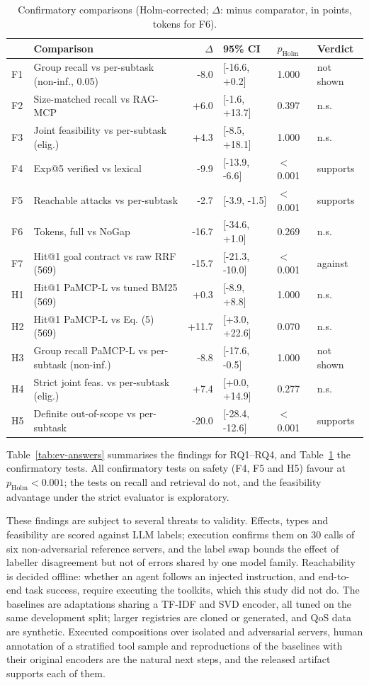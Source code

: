 \begin{table}[t]
\centering
\caption{Confirmatory comparisons (Holm-corrected; $\Delta$: \pamcp{} minus comparator, in points, tokens for F6).}
\label{tab:ev-family}
\scriptsize
\setlength{\tabcolsep}{2.2pt}
\begin{tabular}{@{}llrlll@{}}
\toprule
 & Comparison & $\Delta$ & 95\% CI & $p_{\mathrm{Holm}}$ & Verdict \\
\midrule
F1 & Group recall vs per-subtask (non-inf., 0.05) & -8.0 & [-16.6, +0.2] & 1.000 & not shown \\
F2 & Size-matched recall vs RAG-MCP & +6.0 & [-1.6, +13.7] & 0.397 & n.s. \\
F3 & Joint feasibility vs per-subtask (elig.) & +4.3 & [-8.5, +18.1] & 1.000 & n.s. \\
F4 & Exp@5 verified vs lexical & -9.9 & [-13.9, -6.6] & $<$0.001 & supports \\
F5 & Reachable attacks vs per-subtask & -2.7 & [-3.9, -1.5] & $<$0.001 & supports \\
F6 & Tokens, full vs NoGap & -16.7 & [-34.6, +1.0] & 0.269 & n.s. \\
F7 & Hit@1 goal contract vs raw RRF (569) & -15.7 & [-21.3, -10.0] & $<$0.001 & against \\
\midrule
H1 & Hit@1 PaMCP-L vs tuned BM25 (569) & +0.3 & [-8.9, +8.8] & 1.000 & n.s. \\
H2 & Hit@1 PaMCP-L vs Eq. (5) (569) & +11.7 & [+3.0, +22.6] & 0.070 & n.s. \\
H3 & Group recall PaMCP-L vs per-subtask (non-inf.) & -8.8 & [-17.6, -0.5] & 1.000 & not shown \\
H4 & Strict joint feas. vs per-subtask (elig.) & +7.4 & [+0.0, +14.9] & 0.277 & n.s. \\
H5 & Definite out-of-scope vs per-subtask & -20.0 & [-28.4, -12.6] & $<$0.001 & supports \\
\bottomrule
\end{tabular}
\end{table}

Table~\ref{tab:ev-answers} summarises the findings for RQ1--RQ4, and Table~\ref{tab:ev-family} the confirmatory
tests. All confirmatory tests on safety (F4, F5 and H5) favour \pamcp{} at $p_{\mathrm{Holm}}<0.001$; the tests on
recall and retrieval do not, and the feasibility advantage under the strict evaluator is exploratory.

These findings are subject to several threats to validity. Effects, types and feasibility are scored against LLM
labels; execution confirms them on 30 calls of six non-adversarial reference servers, and the label swap bounds
the effect of labeller disagreement but not of errors shared by one model family. Reachability is decided offline:
whether an agent follows an injected instruction, and end-to-end task success, require executing the toolkits,
which this study did not do. The baselines are adaptations sharing a TF-IDF and SVD encoder, all tuned on the same
development split; larger registries are cloned or generated, and QoS data are synthetic. Executed compositions
over isolated and adversarial servers, human annotation of a stratified tool sample and reproductions of the
baselines with their original encoders are the natural next steps, and the released artifact supports each of
them.
